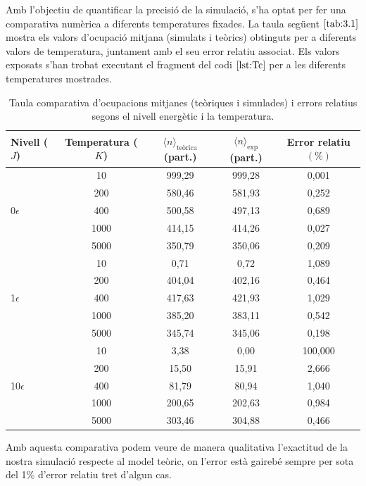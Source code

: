 \documentclass[a4paper,10.5pt]{report}
\begin{document}
Amb l'objectiu de quantificar la precisió de la simulació, s'ha optat per fer una comparativa numèrica a diferents temperatures fixades. La taula següent $\ref{tab:3.1}$ mostra els valors d'ocupació mitjana (simulats i teòrics) obtinguts per a diferents valors de temperatura, juntament amb el seu error relatiu associat. Els valors exposats s'han trobat executant el fragment del codi $\ref{lst:Tc}$ per a les diferents temperatures mostrades. 

\begin{table}[H]
	\centering
	\small
	\renewcommand{\arraystretch}{1.2}
	\caption{Taula comparativa d'ocupacions mitjanes (teòriques i simulades) i errors relatius segons el nivell energètic i la temperatura.  }
	\begin{tabular}{lcccc}
		\toprule
		Nivell ($J$) & Temperatura ($K$) & $\langle n \rangle_{\text{teòrica}}$ (part.) & $\langle n \rangle_{\text{exp}}$ (part.) & Error relatiu $(\%)$ \\
		\midrule
		  &  10  & 999,29 & 999,28 & 0,001 \\
		  &  200   & 580,46 & 581,93 & 0,252 \\
		 0$\epsilon $ &  400 & 500,58 &  497,13 & 0,689 \\
		 &  1000   & 414,15 & 414,26 & 0,027\\
		  &  5000 & 350,79 & 350,06 &  0,209 \\
		\midrule
		  & 10  & 0,71 & 0,72  & 1,089 \\
		  &  200   & 404,04 & 402,16 & 0,464  \\
		1$\epsilon $ &  400 & 417,63  & 421,93 & 1,029 \\
		&  1000   & 385,20 & 383,11 & 0,542 \\
		 &  5000 & 345,74 &  345,06 & 0,198 \\
		\midrule
		 & 10 & 3,38 & 0,00  & 100,000 \\
		 &  200   & 15,50 & 15,91 & 2,666 \\
		10$\epsilon $& 400 & 81,79 & 80,94  & 1,040 \\
		&  1000   & 200,65 & 202,63 & 0,984 \\
		 & 5000 & 303,46 & 304,88  &  0,466 \\
		\bottomrule
	\end{tabular}
	\label{tab:3.1}
\end{table}

Amb aquesta comparativa podem veure de manera qualitativa l'exactitud de la nostra simulació respecte al model teòric, on l'error està gairebé sempre per sota del 1$\%$ d'error relatiu tret d'algun cas. 
\end{document}
